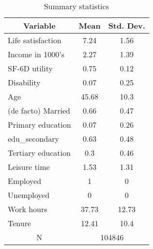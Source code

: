 
\begin{table}[htbp]\centering \caption{Summary statistics \label{descstat}}
\begin{tabular}{l c c  }\hline\hline
\multicolumn{1}{c}{\textbf{Variable}} & \textbf{Mean}
 & \textbf{Std. Dev.} \\ \hline
Life satisfaction & 7.24 & 1.56  \\
Income in 1000's & 2.27 & 1.39  \\
SF-6D utility & 0.75 & 0.12  \\
Disability & 0.07 & 0.25  \\
Age & 45.68 & 10.3  \\
(de facto) Married & 0.66 & 0.47  \\
Primary education & 0.07 & 0.26  \\
edu\_secondary & 0.63 & 0.48  \\
Tertiary education & 0.3 & 0.46  \\
Leisure time & 1.53 & 1.31  \\
Employed & 1 & 0  \\
Unemployed & 0 & 0  \\
Work hours & 37.73 & 12.73  \\
Tenure & 12.41 & 10.4  \\
\multicolumn{1}{c}{N} & \multicolumn{2}{c}{104846}\\ \hline\end{tabular}
\end{table}
